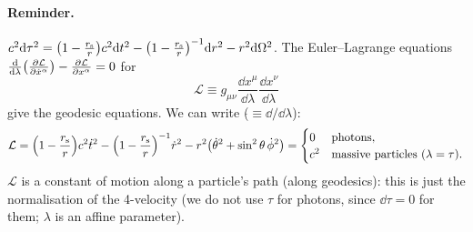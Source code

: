 \paragraph{Reminder.} $c^2\mathrm{d}\tau^2=\big(1-\frac{r_{\mathrm s}} r\big)c^2\mathrm{d} t^2-\big(1-\frac{r_{\mathrm s}} r\big)^{-1}\mathrm{d} r^2-r^2\mathrm{d}\Omega^2$. The Euler--Lagrange equations $\frac{\mathrm{d}}{\mathrm{d}\lambda}\big(\frac{\partial\mathcal L}{\partial\dot x^\alpha}\big)-\frac{\partial\mathcal L}{\partial x^\alpha}=0$ for
\[
  \mathcal L\equiv g_{\mu\nu}\frac{\dd x^\mu}{\dd\lambda}\frac{\dd x^\nu}{\dd\lambda}
\]
give the geodesic equations. We can write ($\dot{}\equiv\dd/\dd\lambda$):
\begin{equation}
  \mathcal L=\Big(1-\frac{r_{\mathrm s}} r\Big)c^2\dot t^2-\Big(1-\frac{r_{\mathrm s}} r\Big)^{-1}\dot r^2-r^2\big(\dot\theta^2+\sin^2\theta\,\dot\phi^2\big)=\begin{cases}0&\text{photons},\\ c^2&\text{massive particles ($\lambda=\tau$)}.\end{cases}
\end{equation}
$\mathcal L$ is a constant of motion along a particle's path (along geodesics): this is just the normalisation of the 4-velocity (we do not use $\tau$ for photons, since $\dd\tau=0$ for them; $\lambda$ is an affine parameter).

